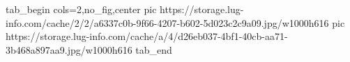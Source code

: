  
 
 
 
 

\ifcmt
  tab_begin cols=2,no_fig,center
     pic https://storage.lug-info.com/cache/2/2/a6337c0b-9f66-4207-b602-5d023c2c9a09.jpg/w1000h616
		 pic https://storage.lug-info.com/cache/a/4/d26eb037-4bf1-40cb-aa71-3b468a897aa9.jpg/w1000h616
  tab_end
\fi
